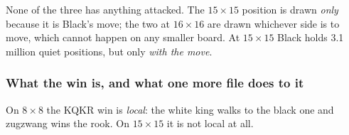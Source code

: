 \documentclass[10pt]{article}
\begin{document}
\medskip
\noindent
{}\hfill
{}\hfill
{}

\medskip
\noindent
None of the three has anything attacked. The $15\times15$ position is drawn
\emph{only} because it is Black's move; the two at $16\times16$ are drawn
whichever side is to move, which cannot happen on any smaller board. At
$15\times15$ Black holds 3.1 million quiet positions, but only \emph{with the
move}.

\subsubsection{What the win is, and what one more file does to it}\label{sub:kqkr-mechanism}

\noindent
On $8\times8$ the KQKR win is \emph{local}: the white king walks to the black
one and zugzwang wins the rook. On $15\times15$ it is not local at all.
\end{document}

